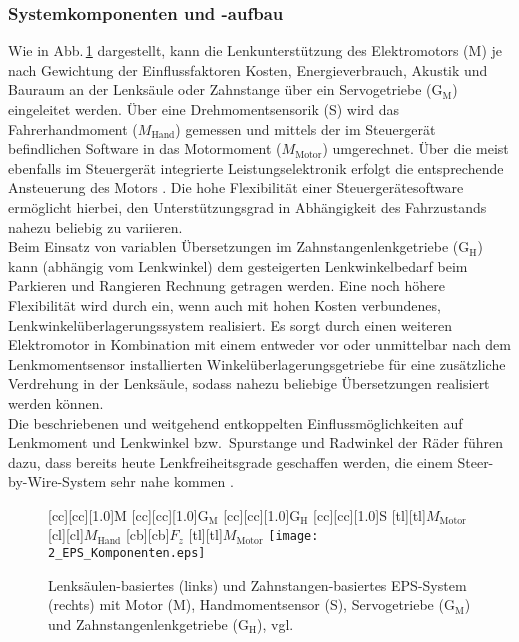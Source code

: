 \subsubsection{Systemkomponenten und -aufbau} \label{sec:eps_Aufbau}
Wie in Abb.\,\ref{fig:eps_funktionsweise} dargestellt, kann die Lenkunterstützung des Elektromotors (M) je nach Gewichtung der Einflussfaktoren Kosten, Energieverbrauch, Akustik und Bauraum an der Lenksäule oder Zahnstange über ein Servogetriebe (G$_\text{M}$) eingeleitet werden. Über eine Drehmomentsensorik (S) wird das Fahrerhandmoment ($M_\text{Hand}$) gemessen und mittels der im Steuergerät befindlichen Software in das Motormoment ($M_\text{Motor}$) umgerechnet. Über die meist ebenfalls im Steuergerät integrierte Leistungselektronik erfolgt die entsprechende Ansteuerung des Motors \cite{pfeffer2013lenkungshandbuch}. Die hohe Flexibilität einer Steuergerätesoftware ermöglicht hierbei, den Unterstützungsgrad in Abhängigkeit des Fahrzustands nahezu beliebig zu variieren. \\
Beim Einsatz von variablen Übersetzungen im Zahnstangenlenkgetriebe (G$_\text{H}$) kann (abhängig vom Lenkwinkel) dem gesteigerten Lenkwinkelbedarf beim Parkieren und Rangieren Rechnung getragen werden. %
Eine noch höhere Flexibilität wird durch ein, wenn auch mit hohen Kosten verbundenes, Lenkwinkelüberlagerungssystem realisiert. Es sorgt durch einen weiteren Elektromotor in Kombination mit einem entweder vor %
 oder unmittelbar nach dem Lenkmomentsensor installierten Winkelüberlagerungsgetriebe %
für eine zusätzliche Verdrehung in der Lenksäule, sodass nahezu beliebige Übersetzungen realisiert werden können. \\
Die beschriebenen und weitgehend entkoppelten Einflussmöglichkeiten auf Lenkmoment und Lenkwinkel bzw.\ Spurstange und Radwinkel der Räder führen dazu, dass bereits heute Lenkfreiheitsgrade geschaffen werden, die einem Steer-by-Wire-System \cite{odenthal2003ubertragung} sehr nahe kommen \cite{karch2007mechatronische}. 

\begin{figure}[ht]
	[cc][cc][1.0]{M}
	[cc][cc][1.0]{G$_\text{M}$}
	[cc][cc][1.0]{G$_\text{H}$}
	[cc][cc][1.0]{S}
	[tl][tl]{$M_\text{Motor}$}
	[cl][cl]{$M_\text{Hand}$}
	[cb][cb]{$F_z$}
	[tl][tl]{$M_\text{Motor}$}
\centering
\texttt{[image: 2\_EPS\_Komponenten.eps]}
 \caption[Lenksäulen-basiertes und Zahnstangen-basiertes EPS-System]{Lenksäulen-basiertes (links) und Zahnstangen-basiertes EPS-System (rechts) mit Motor (M), Handmomentsensor (S), Servogetriebe (G$_\text{M}$) und Zahnstangenlenkgetriebe (G$_\text{H}$), vgl.\ \cite{pfeffer2013lenkungshandbuch}}
 \label{fig:eps_funktionsweise}
\end{figure} 

